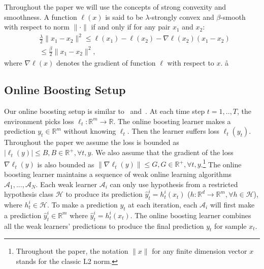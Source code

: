 Throughout the paper we will use the concepts of strong convexity and smoothness.
A function $\ell(x)$ is said to be $\lambda$-strongly convex and $\beta$-smooth with respect to norm $\|\cdot\|$ if and only if for any pair $x_1$ and $x_2$:
\begin{align}
 &\frac{\lambda}{2}\|x_1 - x_{2}\|^2 \leq \ell(x_1) - \ell(x_{2}) - \nabla \ell(x_2)(x_1-x_{2})  \nonumber\\
 &\leq \frac{\beta}{2}\|x_1 - x_{2}\|^2,
\end{align} where $\nabla \ell(x)$ denotes the gradient of function $\ell$ with respect to $x$. 
å
\subsection{Online Boosting Setup}
\label{sec:boosting_setup}
Our online boosting setup is similar to~\citep{beygelzimer2015optimal} and~\citep{beygelzimer2015online}. At each time step $t = 1,..,T$, the environment picks loss $\ell_t: \mathbb{R}^m \rightarrow \mathbb{R}$. The online boosting learner makes a prediction ${y}_t \in \mathbb{R}^m$ without knowing $\ell_t$. Then the learner suffers loss $\ell_t({y}_t)$. Throughout the paper we assume the loss is bounded as $|\ell_t(y)|\leq B, B\in\mathbb{R}^+, \forall t,y$. We also assume that the gradient of the loss $\nabla\ell_t(y)$ is also bounded as $\|\nabla\ell_t(y)\|\leq G, G\in\mathbb{R}^+, \forall t,y$.\footnote{Throughout the paper, the notation $\|x\|$ for any finite dimension vector $x$ stands for the classic L2 norm.} The online boosting learner maintains a sequence of weak online learning algorithms $\mathcal{A}_1, ..., \mathcal{A}_N$. 
Each weak learner $\mathcal{A}_i$ can only use hypothesis from a restricted hypothesis class $\mathcal{H}$ to produce its prediction $\hat{y}^i_t = h_t^i(x_t)$ ($h: \mathbb{R}^d\to\mathbb{R}^m,\forall h\in\mathcal{H}$), where $h_t^i\in\mathcal{H}$. 
To make a prediction ${y}_t$ at each iteration, each $\mathcal{A}_i$ will first make a prediction $\hat{y}^i_t\in\mathbb{R}^m$ where $\hat{y}^i_t = h_t^i(x_t)$. The online boosting learner combines all the weak learners' predictions to produce the final prediction $y_t$ for sample $x_t$. 

